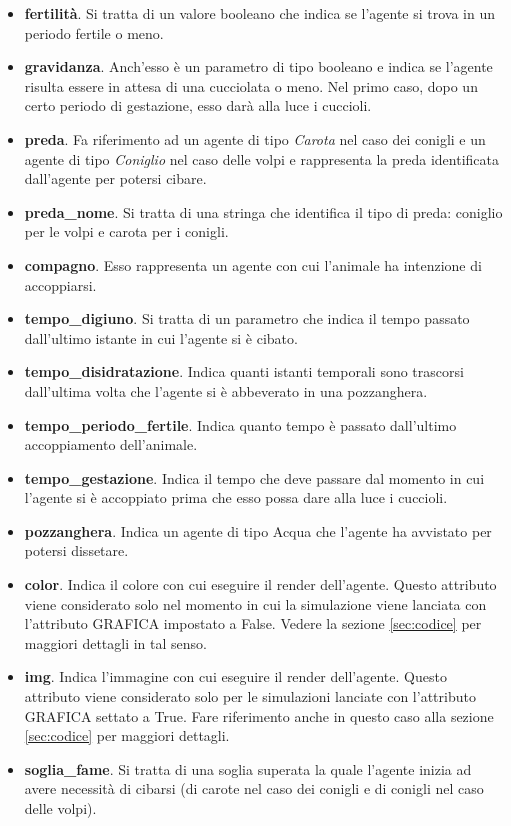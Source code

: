 \documentclass[11pt]{article}
\begin{document}
\begin{itemize}
    \item \textbf{fertilità}. Si tratta di un valore booleano che indica se l'agente si trova in un periodo fertile o meno. 
    \item \textbf{gravidanza}. Anch'esso è un parametro di tipo booleano e indica se l'agente risulta essere in attesa di una cucciolata o meno. Nel primo caso, dopo un certo periodo di gestazione, esso darà alla luce i cuccioli. 
    \item \textbf{preda}. Fa riferimento ad un agente di tipo \emph{Carota} nel caso dei conigli e un agente di tipo \emph{Coniglio} nel caso delle volpi e rappresenta la preda identificata dall'agente per potersi cibare. 
    \item \textbf{preda\_nome}. Si tratta di una stringa che identifica il tipo di preda: coniglio per le volpi e carota per i conigli. 
    \item \textbf{compagno}. Esso rappresenta un agente con cui l'animale ha intenzione di accoppiarsi. 
    \item \textbf{tempo\_digiuno}. Si tratta di un parametro che indica il tempo passato dall'ultimo istante in cui l'agente si è cibato.
    \item \textbf{tempo\_disidratazione}. Indica quanti istanti temporali sono trascorsi dall'ultima volta che l'agente si è abbeverato in una pozzanghera. 
    \item \textbf{tempo\_periodo\_fertile}. Indica quanto tempo è passato dall'ultimo accoppiamento dell'animale. 
    \item \textbf{tempo\_gestazione}. Indica il tempo che deve passare dal momento in cui l'agente si è accoppiato prima che esso possa dare alla luce i cuccioli. 
    \item \textbf{pozzanghera}. Indica un agente di tipo Acqua che l'agente ha avvistato per potersi dissetare.
    \item \textbf{color}. Indica il colore con cui eseguire il render dell'agente. Questo attributo viene considerato solo nel momento in cui la simulazione viene lanciata con l'attributo GRAFICA impostato a False. Vedere la sezione \ref{sec:codice} per maggiori dettagli in tal senso. 
    \item \textbf{img}. Indica l'immagine con cui eseguire il render dell'agente. Questo attributo viene considerato solo per le simulazioni lanciate con l'attributo GRAFICA settato a True. Fare riferimento anche in questo caso alla sezione \ref{sec:codice} per maggiori dettagli. 
    \item \textbf{soglia\_fame}. Si tratta di una soglia superata la quale l'agente inizia ad avere necessità di cibarsi (di carote nel caso dei conigli e di conigli nel caso delle volpi).

\end{itemize}
\end{document}
